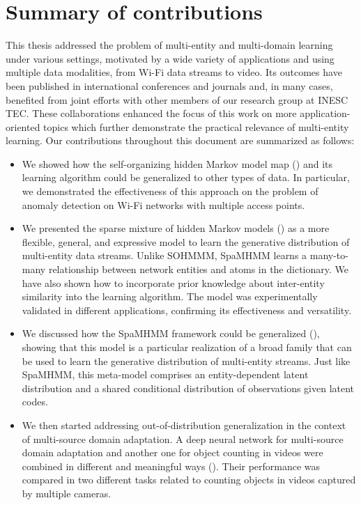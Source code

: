 \section{Summary of contributions}
This thesis addressed the problem of multi-entity and multi-domain learning under various settings, motivated by a wide variety of applications and using multiple data modalities, from Wi-Fi data streams to video. Its outcomes have been published in international conferences and journals and, in many cases, benefited from joint efforts with other members of our research group at INESC TEC. These collaborations enhanced the focus of this work on more application-oriented topics which further demonstrate the practical relevance of multi-entity learning. Our contributions throughout this document are summarized as follows:
\begin{itemize}
    \item We showed how the self-organizing hidden Markov model map () and its learning algorithm could be generalized to other types of data. In particular, we demonstrated the effectiveness of this approach on the problem of anomaly detection on Wi-Fi networks with multiple access points.
    \item We presented the sparse mixture of hidden Markov models () as a more flexible, general, and expressive model to learn the generative distribution of multi-entity data streams. Unlike SOHMMM, SpaMHMM learns a many-to-many relationship between network entities and atoms in the dictionary. We have also shown how to incorporate prior knowledge about inter-entity similarity into the learning algorithm. The model was experimentally validated in different applications, confirming its effectiveness and versatility.
    \item We discussed how the SpaMHMM framework could be generalized (), showing that this model is a particular realization of a broad family that can be used to learn the generative distribution of multi-entity streams. Just like SpaMHMM, this meta-model comprises an entity-dependent latent distribution and a shared conditional distribution of observations given latent codes.
    \item We then started addressing out-of-distribution generalization in the context of multi-source domain adaptation. A deep neural network for multi-source domain adaptation and another one for object counting in videos were combined in different and meaningful ways (). Their performance was compared in two different tasks related to counting objects in videos captured by multiple cameras.

\end{itemize}

